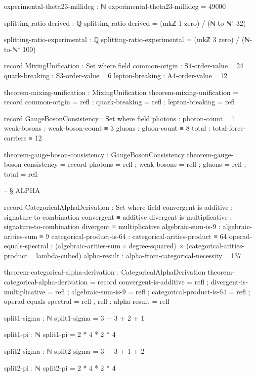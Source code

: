\documentclass[11pt,a4paper]{book}
\begin{document}
\begin{code}
experimental-theta23-millideg : ℕ
experimental-theta23-millideg = 49000

splitting-ratio-derived : ℚ
splitting-ratio-derived = (mkℤ 1 zero) / (ℕ-to-ℕ⁺ 32)

splitting-ratio-experimental : ℚ
splitting-ratio-experimental = (mkℤ 3 zero) / (ℕ-to-ℕ⁺ 100)

record MixingUnification : Set where
  field
    common-origin    : S4-order-value ≡ 24
    quark-breaking   : S3-order-value ≡ 6
    lepton-breaking  : A4-order-value ≡ 12

theorem-mixing-unification : MixingUnification
theorem-mixing-unification = record
  { common-origin   = refl
  ; quark-breaking  = refl
  ; lepton-breaking = refl
  }

record GaugeBosonConsistency : Set where
  field
    photons     : photon-count ≡ 1
    weak-bosons : weak-boson-count ≡ 3
    gluons      : gluon-count ≡ 8
    total       : total-force-carriers ≡ 12

theorem-gauge-boson-consistency : GaugeBosonConsistency
theorem-gauge-boson-consistency = record
  { photons     = refl
  ; weak-bosons = refl
  ; gluons      = refl
  ; total       = refl
  }


-- § ALPHA

record CategoricalAlphaDerivation : Set where
  field
    convergent-is-additive    : signature-to-combination convergent ≡ additive
    divergent-is-multiplicative : signature-to-combination divergent ≡ multiplicative
    algebraic-sum-is-9        : algebraic-arities-sum ≡ 9
    categorical-product-is-64 : categorical-arities-product ≡ 64
    operad-equals-spectral    : (algebraic-arities-sum ≡ degree-squared) × 
                                (categorical-arities-product ≡ lambda-cubed)
    alpha-result              : alpha-from-categorical-necessity ≡ 137

theorem-categorical-alpha-derivation : CategoricalAlphaDerivation
theorem-categorical-alpha-derivation = record
  { convergent-is-additive      = refl
  ; divergent-is-multiplicative = refl
  ; algebraic-sum-is-9          = refl
  ; categorical-product-is-64   = refl
  ; operad-equals-spectral      = refl , refl
  ; alpha-result                = refl
  }

split1-sigma : ℕ
split1-sigma = 3 + 3 + 2 + 1

split1-pi : ℕ
split1-pi = 2 * 4 * 2 * 4

split2-sigma : ℕ
split2-sigma = 3 + 3 + 1 + 2

split2-pi : ℕ
split2-pi = 2 * 4 * 2 * 4


\end{code}
\end{document}
